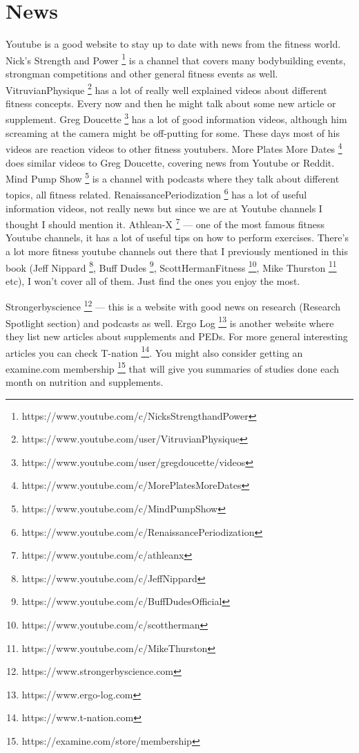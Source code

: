 \documentclass[openany, 12pt]{book}
\begin{document}
  	\section{News}

        Youtube is a good website to stay up to date with news from the fitness world. Nick's Strength and Power
        \footnote{https://www.youtube.com/c/NicksStrengthandPower} is a channel that covers many bodybuilding events, strongman competitions and
        other general fitness events as well. VitruvianPhysique
        \footnote{https://www.youtube.com/user/VitruvianPhysique} has a lot of really well explained videos about different fitness concepts. Every now
        and then he might talk about some new article or supplement. Greg Doucette
        \footnote{https://www.youtube.com/user/gregdoucette/videos} has a lot of good information videos, although him screaming at the camera might be
        off-putting for some. These days most of his videos are reaction videos to other fitness youtubers. More Plates More Dates
        \footnote{https://www.youtube.com/c/MorePlatesMoreDates} does similar videos to Greg Doucette, covering news from Youtube or
        Reddit. Mind Pump Show
        \footnote{https://www.youtube.com/c/MindPumpShow} is a channel with podcasts where they talk about different topics, all fitness related.
        RenaissancePeriodization
        \footnote{https://www.youtube.com/c/RenaissancePeriodization} has a lot of useful information videos, not really news but since we
        are at Youtube channels I thought I should mention it. Athlean-X
        \footnote{https://www.youtube.com/c/athleanx} --- one of the most famous fitness Youtube channels, it has a lot of useful tips on how to perform
        exercises. 
        There's a lot more fitness youtube channels out there that I previously mentioned in this book (Jeff Nippard
        \footnote{https://www.youtube.com/c/JeffNippard}, Buff Dudes
        \footnote{https://www.youtube.com/c/BuffDudesOfficial}, ScottHermanFitness
        \footnote{https://www.youtube.com/c/scottherman}, Mike Thurston
        \footnote{https://www.youtube.com/c/MikeThurston} etc), I won't cover all of them. Just find the ones you enjoy the most.

        Strongerbyscience
        \footnote{https://www.strongerbyscience.com} --- this is a website with good news on research (Research Spotlight section) and podcasts as well.
        Ergo Log
        \footnote{https://www.ergo-log.com} is another website where they list new articles about supplements and PEDs.
        For more general interesting articles you can check T-nation
        \footnote{https://www.t-nation.com}. You might also consider getting an examine.com membership
        \footnote{https://examine.com/store/membership} that will give you summaries of studies done each month on nutrition and supplements.
        
\end{document}
